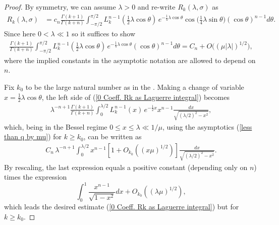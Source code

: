 \documentclass[11pt, reqno]{amsart}
\theoremstyle{plain}
\theoremstyle{remark}
\theoremstyle{example}
\theoremstyle{definition}
\numberwithin{equation}{section}
\begin{document}
\begin{proof}
By symmetry, we can assume $\lambda>0$ and re-write $R_{k}(\lambda, \sigma)$ as 
\begin{equation*}\label{0 Coeff. Rk as Laguerre integral}
   \begin{split}
        R_{k}(\lambda, \sigma) 
        & = c_{n} \frac{\Gamma(k+1)}{\Gamma(k+n)} \int_{- \pi/2}^{\pi/2} L_{k}^{n-1} \left( {\textstyle\frac{1}{2} } \lambda  \cos{\theta}  \right) \, e^{-\frac{1}{4} \lambda \cos{\theta}}  \cos{ \big( {\textstyle \frac{1}{4} } \lambda \sin{\theta} \big)}     (\cos{\theta})^{n-1} d \theta.
   \end{split}
\end{equation*}
Since here $0 < \lambda \ll 1$ so it suffices to show
\begin{equation}\label{0 Coeff. Rk as Laguerre integral}
   \begin{split}
       \frac{\Gamma(k+1)}{\Gamma(k+n)} \int_{- \pi/2}^{\pi/2} L_{k}^{n-1} \left( {\textstyle\frac{1}{2} } \lambda  \cos{\theta}  \right) \, e^{-\frac{1}{4} \lambda \cos{\theta}}      (\cos{\theta})^{n-1} d \theta =  C_{n} + O \big( (\mu |\lambda|)^{1/2} \big),
   \end{split}
\end{equation}
where the implied constants in the asymptotic notation are allowed to depend on $n$.

\noindent Fix $k_{0}$ to be the large natural number as in the . Making a change of variable  $x = \frac{1}{2} \lambda \cos{\theta}$, the left side of (\ref{0 Coeff. Rk as Laguerre integral}) becomes 
\begin{equation}\label{0 x var. lambda less than 1 Coeff. Rk}
   \begin{split}
        \lambda^{-n +1} \frac{\Gamma(k+1)}{\Gamma(k+n)}  \int_{0}^{ \lambda /2}  L_{k}^{n-1}(x) \, e^{-\frac{1}{2} x }  x^{n-1} \frac{dx}{\sqrt{(\lambda/2)^2 -  x^2}},
   \end{split}
\end{equation}
which, being in the Bessel regime $0 \leq  x \leq \lambda \ll 1 / \mu$, using the asymptotics (\ref{less than q by mu}) for  $k \geq k_{0}$,  can be written as
\begin{equation*}\label{-1 x var. lambda less than 1 Coeff. Rk}
   \begin{split}
     C_{n} \,   \lambda^{-n +1}   \int_{0}^{ \lambda /2}  x^{n-1} \left[1 + O_{k_{0}} \left(  (x \mu )^{1/2} \right) \right] \frac{dx}{\sqrt{(\lambda/2)^2 -  x^2}}.
   \end{split}
\end{equation*}
By rescaling, the last expression equals a positive constant (depending only on $n$) times the expression
\begin{equation*}
    \int_{0}^{1} \frac{x^{n-1}}{\sqrt{1 - x^2}} dx + O_{k_{0}}( (\lambda \mu)^{1/2}),
\end{equation*}
which {leads the desired estimate (\ref{0 Coeff. Rk as Laguerre integral}) but for $k \geq k_{0}$.}  


\end{proof}
\end{document}

